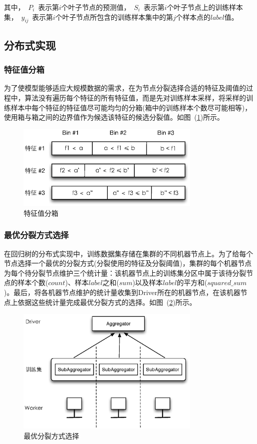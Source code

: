 \documentclass[a4paper,11pt,         %
               ]{article}
\begin{document}
其中，~$P_{i}$~表示第$i$个叶子节点的预测值，~$S_{i}$~表示第$i$个叶子节点上的训练样本集，~$y_{ij}$~表示第$i$个叶子节点所包含的训练样本集中的第$j$个样本点的$label$值。

\subsection{分布式实现}

\subsubsection{特征值分箱}

为了使模型能够适应大规模数据的需求，在为节点分裂选择合适的特征及阈值的过程中，算法没有遍历每个特征的所有特征值，而是先对训练样本采样，将采样的训练样本中每个特征的特征值尽可能均匀的分箱(箱中的训练样本个数尽可能相等)，使用箱与箱之间的边界值作为候选该特征的候选分裂值。如图~(\ref{fig:feature_bins})所示。

\begin{figure}[htbp]
\centering\includegraphics[width=3.5in]{img/feature_bins.eps}
\caption{特征值分箱}\label{fig:feature_bins}
\end{figure}

\subsubsection{最优分裂方式选择}

在回归树的分布式实现中，训练数据集存储在集群的不同机器节点上。为了给每个节点选择一个最优的分裂方式(分裂使用的特征及分裂阈值)，集群的每个机器节点为每个待分裂节点维护三个统计量：该机器节点上的训练集分区中属于该待分裂节点的样本个数($count$)、样本$label$之和($sum$)以及样本$label$的平方和($squared\_sum$)。最后，将各机器节点维护的统计量收集到Driver所在的机器节点，在该机器节点上依据这些统计量完成最优分裂方式的选择。如图~(\ref{fig:best_split})所示。

\begin{figure}[htbp]
\centering\includegraphics[width=3.5in]{img/best_split.eps}
\caption{最优分裂方式选择}\label{fig:best_split}
\end{figure}
\end{document}
